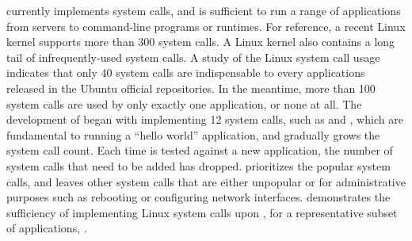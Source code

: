 







\Thelibos{} currently implements \graphenesyscallnum{} system calls,
and is sufficient to run a range of applications from servers to command-line programs or runtimes.
For reference, a recent Linux kernel supports more than 300 system calls.
A Linux kernel also
contains a long tail of infrequently-used system calls.
A study of the Linux system call usage~\cite{tsai16apistudy}
indicates that only 40 system calls are indispensable to every applications released in the Ubuntu official repositories.
In the meantime, more than 100 system calls are used by only exactly one application,
or none at all.
The development of \thelibos{} began with
implementing 12 system calls, such as  and , which are fundamental to running a ``hello world'' application,
and gradually grows the system call count.
Each time \thelibos{} is tested against a new application, the number of system calls that need to be added has dropped.
\graphene{} prioritizes the popular system calls, and leaves other system calls that are either unpopular or for administrative purposes such as rebooting
or configuring network interfaces.
\thelibos{} demonstrates the sufficiency of
implementing Linux system calls upon \thehostabi{},
for a representative subset of applications, .


